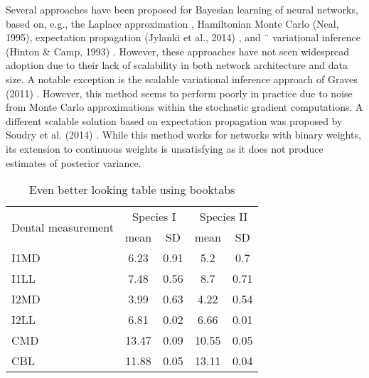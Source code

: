 Several approaches have been proposed for Bayesian learning
of neural networks, based on, e.g., the Laplace approximation \cite{Mackay1991APB}, Hamiltonian Monte Carlo (Neal,
1995), expectation propagation (Jylanki et al., 2014) \cite{Jylanki:2014:EPN:2627435.2638593}, and ¨
variational inference (Hinton & Camp, 1993) \cite{hinton1993keeping}. However,
these approaches have not seen widespread adoption due
to their lack of scalability in both network architecture
and data size. A notable exception is the scalable variational
inference approach of Graves (2011) \cite{graves2011practical}. However, this method seems to perform poorly in practice due to noise
from Monte Carlo approximations within the stochastic
gradient computations. A different scalable solution based
on expectation propagation was proposed by Soudry et al.
(2014) \cite{Soudry}. While this method works for networks with binary
weights, its extension to continuous weights is unsatisfying
as it does not produce estimates of posterior variance.



\begin{table}
\caption{Even better looking table using booktabs}
\centering
\label{table:good_table}
\begin{tabular}{l c c c c}
\toprule
\multirow{2}{*}{Dental measurement} & \multicolumn{2}{c}{Species I} & \multicolumn{2}{c}{Species II} \\ 
\cmidrule{2-5}
  & mean & SD  & mean & SD  \\ 
\midrule
I1MD & 6.23 & 0.91 & 5.2  & 0.7  \\

I1LL & 7.48 & 0.56 & 8.7  & 0.71 \\

I2MD & 3.99 & 0.63 & 4.22 & 0.54 \\

I2LL & 6.81 & 0.02 & 6.66 & 0.01 \\

CMD & 13.47 & 0.09 & 10.55 & 0.05 \\

CBL & 11.88 & 0.05 & 13.11 & 0.04\\ 
\bottomrule
\end{tabular}
\end{table}
